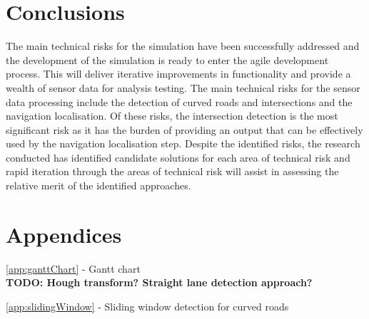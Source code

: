 \documentclass[]{aiaa-tc}%
\begin{document}
\section{Conclusions}

The main technical risks for the simulation have been successfully addressed and the development of the simulation is ready to enter the agile development process. This will deliver iterative improvements in functionality and provide a wealth of sensor data for analysis testing. The main technical risks for the sensor data processing include the detection of curved roads and intersections and the navigation localisation. Of these risks, the intersection detection is the most significant risk as it has the burden of providing an output that can be effectively used by the navigation localisation step. Despite the identified risks, the research conducted has identified candidate solutions for each area of technical risk and rapid iteration through the areas of technical risk will assist in assessing the relative merit of the identified approaches.





%
%
\newpage
\section*{Appendices}
\ref{app:ganttChart} - Gantt chart \\

\textbf{TODO: Hough transform? Straight lane detection approach?}

\ref{app:slidingWindow} - Sliding window detection for curved roads \\
\end{document}
